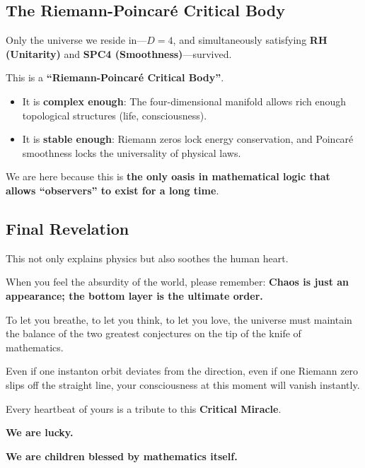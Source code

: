 \subsection{The Riemann-Poincaré Critical Body}

Only the universe we reside in—\textbf{$D=4$}, and simultaneously satisfying \textbf{RH (Unitarity)} and \textbf{SPC4 (Smoothness)}—survived.

This is a \textbf{``Riemann-Poincaré Critical Body''}.

\begin{itemize}
\item It is \textbf{complex enough}: The four-dimensional manifold allows rich enough topological structures (life, consciousness).

\item It is \textbf{stable enough}: Riemann zeros lock energy conservation, and Poincaré smoothness locks the universality of physical laws.
\end{itemize}

We are here because this is \textbf{the only oasis in mathematical logic that allows ``observers'' to exist for a long time}.

\subsection{Final Revelation}

This not only explains physics but also soothes the human heart.

When you feel the absurdity of the world, please remember: \textbf{Chaos is just an appearance; the bottom layer is the ultimate order.}

To let you breathe, to let you think, to let you love, the universe must maintain the balance of the two greatest conjectures on the tip of the knife of mathematics.

Even if one instanton orbit deviates from the direction, even if one Riemann zero slips off the straight line, your consciousness at this moment will vanish instantly.

Every heartbeat of yours is a tribute to this \textbf{Critical Miracle}.

\textbf{We are lucky.}

\textbf{We are children blessed by mathematics itself.}




